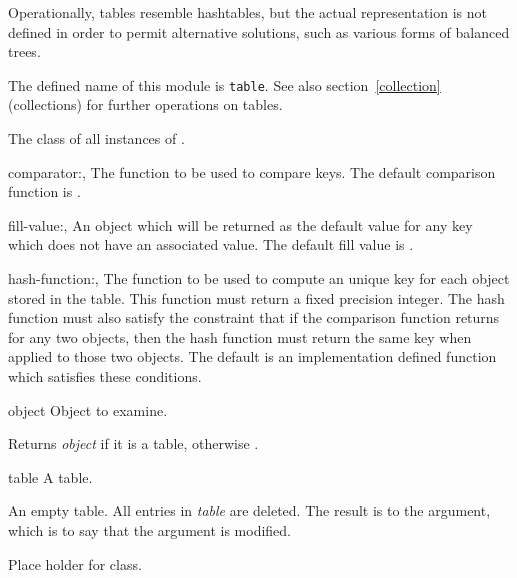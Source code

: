 \label{table}
%
\begin{optRationale}
    Operationally, tables resemble hashtables, but the actual representation is
    not defined in order to permit alternative solutions, such as various forms
    of balanced trees.
\end{optRationale}
%
\begin{optDefinition}
The defined name of this module is {\tt table}.  See also
section~\ref{collection} (collections) for further operations on tables.

%
The class of all instances of .
%
\begin{initoptions}
    \item[comparator:, \classref{function}]%
    The function to be used to compare keys.  The default comparison function is
    .

    \item[fill-value:, \classref{object}]%
    An object which will be returned as the default value for any key which does
    not have an associated value.  The default fill value is \nil{}.

    \item[hash-function:, \classref{function}]%
    The function to be used to compute an unique key for each object stored in
    the table.  This function must return a fixed precision integer.  The hash
    function must also satisfy the constraint that if the comparison function
    returns \true{} for any two objects, then the hash function must return the
    same key when applied to those two objects.  The default is an
    implementation defined function which satisfies these conditions.
\end{initoptions}

%
\begin{arguments}
    \item[object] Object to examine.
\end{arguments}
%
\result%
Returns {\em object\/} if it is a table, otherwise \nil{}.

%
\begin{arguments}
    \item[table] A table.
\end{arguments}
%
\result%
An empty table.
%
\remarks%
All entries in {\em table\/} are deleted.  The result is  to the
argument, which is to say that the argument is modified.

%
Place holder for  class.

\end{optDefinition}
